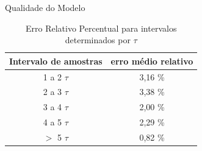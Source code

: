\begin{frame}{Qualidade do Modelo}

\begin{table}[h]
\centering
\caption{Erro Relativo Percentual para intervalos determinados por $\tau$ }
\label{tab:ErroModeloTau}

\begin{tabular}{c|c}
\hline
Intervalo de amostras  &  erro médio relativo \\ \hline
\hline
1 a 2 $\tau$ &  3,16 \% \\ \hline
2 a 3 $\tau$ &  3,38 \% \\ \hline
3 a 4 $\tau$ &  2,00 \% \\ \hline
4 a 5 $\tau$ &  2,29 \% \\ \hline
$>$ 5 $\tau$ &  0,82 \% \\ \hline
\end{tabular}

\end{table}


\end{frame}










